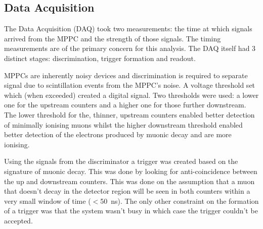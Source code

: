 \documentclass[]{article}
\begin{document}
\subsection{Data Acquisition} %
\label{sub:data_acquisition}
The Data Acquisition (DAQ) took two measurements: the time at which signals arrived from the MPPC and the strength of those signals. The timing measurements are of the primary concern for this analysis. The DAQ itself had 3 distinct stages: discrimination, trigger formation and readout.

MPPCs are inherently noisy devices and discrimination is required to separate signal due to scintillation events from the MPPC's noise. A voltage threshold set which (when exceeded) created a digital signal. Two thresholds were used: a lower one for the upstream counters and a higher one for those further downstream. The lower threshold for the, thinner, upstream counters enabled better detection of minimally ionising muons whilst the higher downstream threshold enabled better detection of the electrons produced by muonic decay and are more ionising. 

Using the signals from the discriminator a trigger was created based on the signature of muonic decay. This was done by looking for anti-coincidence between the up and downstream counters. This was done on the assumption that a muon that doesn't decay in the detector region will be seen in both counters within a very small window of time ($<$50~ns). The only other constraint on the formation of a trigger was that the system wasn't busy in which case the trigger couldn't be accepted.
\end{document}
